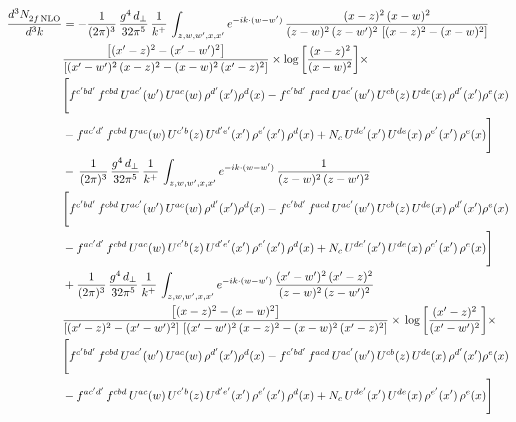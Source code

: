 \documentclass[9pt]{article}
\numberwithin{equation}{section}
\begin{document}
\begin{align}
    \frac{d^{3}N_{2f\,\rm NLO}^{\rm}}{d^{3}k}  & =   - \frac{1}{(2\pi)^{3}}\, \frac{g^{4}\,d_{\perp}}{32\pi^{5}}\,\frac{1}{k^{+}}\,\int_{z,w,w^{\prime},x,x'} e^{-ik\cdot (w-w')}\,\frac{(x-z)^{2}\, (x-w)^{2}}{(z-w)^{2}\, (z-w')^{2}\,\left[(x-z)^{2} - (x-w)^{2}\right]}\notag \\ & \frac{\left[(x'-z)^{2}-(x'-w')^{2}\right]}{\left[(x'-w')^{2}\, (x-z)^{2} - (x-w)^{2}\, (x'-z)^{2}\right]}\times \log{\left[\frac{(x-z)^{2}}{(x-w)^{2}}\right]}\times\notag \\ & \Bigg[f^{c'bd'}\,f^{cbd}\, U^{ac'}(w')\,U^{ac}(w)\,\rho^{d'}(x')\rho^{d}(x)- f^{c'bd'}\,f^{acd}\,U^{ac'}(w')\,U^{cb}(z)\,U^{de}(x)\,\rho^{d'}(x')\rho^{e}(x) \notag \\ & -f^{ac'd'}\,f^{cbd}\,U^{ac}(w)\,U^{c'b}(z)\,U^{d'e'}(x')\,\rho^{e'}(x')\,\rho^{d}(x) +N_{c}\,U^{de'}(x')\,U^{de}(x)\,\rho^{e'}(x')\,\rho^{e}(x)\Bigg]  \notag \\
& -\, \frac{1}{(2\pi)^{3}}\, \frac{g^{4}\,d_{\perp}}{32\pi^{5}}\,\frac{1}{k^{+}}\,\int_{z,w,w^{\prime},x,x'} e^{-ik\cdot (w-w')}\,\frac{1}{(z-w)^{2}\, (z-w')^{2}}\notag \\ & \Bigg[f^{c'bd'}\,f^{cbd}\, U^{ac'}(w')\,U^{ac}(w)\,\rho^{d'}(x')\rho^{d}(x)- f^{c'bd'}\,f^{acd}\,U^{ac'}(w')\,U^{cb}(z)\,U^{de}(x)\,\rho^{d'}(x')\rho^{e}(x) \notag \\ & -f^{ac'd'}\,f^{cbd}\,U^{ac}(w)\,U^{c'b}(z)\,U^{d'e'}(x')\,\rho^{e'}(x')\,\rho^{d}(x) +N_{c}\,U^{de'}(x')\,U^{de}(x)\,\rho^{e'}(x')\,\rho^{e}(x)\Bigg]  \notag \\
& + \frac{1}{(2\pi)^{3}}\, \frac{g^{4}\,d_{\perp}}{32\pi^{5}}\,\frac{1}{k^{+}}\,\int_{z,w,w^{\prime},x,x'} e^{-ik\cdot (w-w')}\,\frac{(x'-w')^{2}\, (x'-z)^{2}}{(z-w)^{2}\, (z-w')^{2}}\notag \\ & \frac{\left[(x-z)^{2} - (x-w)^{2}\right]}{\left[(x'-z)^{2} - (x'-w')^{2}\right]\, \left[(x'-w')^{2}\, (x - z)^{2} - (x-w)^{2}\,(x'-z)^{2}\right]}\times\, \log{\left[\frac{(x'-z)^{2}}{(x'-w')^{2}}\right]}\times \notag \\ &  \Bigg[f^{c'bd'}\,f^{cbd}\, U^{ac'}(w')\,U^{ac}(w)\,\rho^{d'}(x')\rho^{d}(x)- f^{c'bd'}\,f^{acd}\,U^{ac'}(w')\,U^{cb}(z)\,U^{de}(x)\,\rho^{d'}(x')\rho^{e}(x) \notag \\ & -f^{ac'd'}\,f^{cbd}\,U^{ac}(w)\,U^{c'b}(z)\,U^{d'e'}(x')\,\rho^{e'}(x')\,\rho^{d}(x) +N_{c}\,U^{de'}(x')\,U^{de}(x)\,\rho^{e'}(x')\,\rho^{e}(x)\Bigg]

\end{align}
\end{document}
